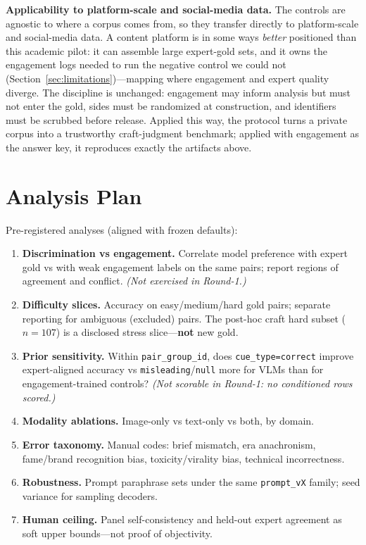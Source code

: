 \documentclass[11pt,a4paper]{article}
\begin{document}
\textbf{Applicability to platform-scale and social-media data.} The controls are agnostic to where a corpus comes from, so they transfer directly to platform-scale and social-media data. A content platform is in some ways \emph{better} positioned than this academic pilot: it can assemble large expert-gold sets, and it owns the engagement logs needed to run the negative control we could not (Section~\ref{sec:limitations})---mapping where engagement and expert quality diverge. The discipline is unchanged: engagement may inform analysis but must not enter the gold, sides must be randomized at construction, and identifiers must be scrubbed before release. Applied this way, the protocol turns a private corpus into a trustworthy craft-judgment benchmark; applied with engagement as the answer key, it reproduces exactly the artifacts above.

\section{Analysis Plan}
\label{sec:analysis}

Pre-registered analyses (aligned with frozen defaults):

\begin{enumerate}[leftmargin=*,itemsep=2pt]
  \item \textbf{Discrimination vs engagement.} Correlate model preference with expert gold vs with weak engagement labels on the same pairs; report regions of agreement and conflict. \emph{(Not exercised in Round-1.)}
  \item \textbf{Difficulty slices.} Accuracy on easy/medium/hard gold pairs; separate reporting for ambiguous (excluded) pairs. The post-hoc craft hard subset ($n=107$) is a disclosed stress slice---\textbf{not} new gold.
  \item \textbf{Prior sensitivity.} Within \texttt{pair\_group\_id}, does \texttt{cue\_type=correct} improve expert-aligned accuracy vs \texttt{misleading}/\texttt{null} more for VLMs than for engagement-trained controls? \emph{(Not scorable in Round-1: no conditioned rows scored.)}
  \item \textbf{Modality ablations.} Image-only vs text-only vs both, by domain.
  \item \textbf{Error taxonomy.} Manual codes: brief mismatch, era anachronism, fame/brand recognition bias, toxicity/virality bias, technical incorrectness.
  \item \textbf{Robustness.} Prompt paraphrase sets under the same \texttt{prompt\_vX} family; seed variance for sampling decoders.
  \item \textbf{Human ceiling.} Panel self-consistency and held-out expert agreement as soft upper bounds---not proof of objectivity.
\end{enumerate}
\end{document}
